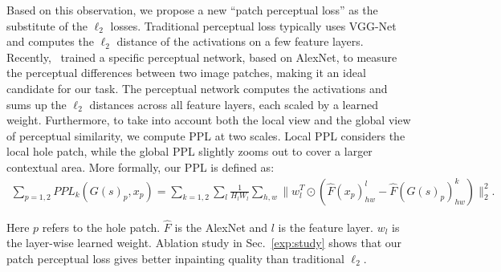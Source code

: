 Based on this observation, we propose a new ``patch perceptual loss'' as the substitute of the $\ell_2$ losses. Traditional perceptual loss typically uses VGG-Net and computes the $\ell_2$ distance of the activations on a few feature layers. Recently,~\cite{zhang2018unreasonable} trained a specific perceptual network, based on AlexNet, to measure the perceptual differences between two image patches, making it an ideal candidate for our task. The perceptual network computes the activations and sums up the $\ell_2$ distances across all feature layers, each scaled by a learned weight. Furthermore, to take into account both the local view and the global view of perceptual similarity, we compute PPL at two scales. Local PPL considers the local hole patch, while the global PPL slightly zooms out to cover a larger contextual area. More formally, our PPL is defined as:
\begin{eqnarray}
\sum\limits_{p=1,2}PPL_k(G(s)_p, x_p) = \sum\limits_{k=1,2}\sum\limits_l\frac{1}{H_lW_l}\sum\limits_{h,w}\parallel w_l^T\odot(\hat{F}(x_p)^l_{hw}-\hat{F}(G(s)_p)^k_{hw})\parallel^2_2.
\end{eqnarray}

Here $p$ refers to the hole patch. $\hat{F}$ is the AlexNet and $l$ is the feature layer. $w_l$ is the layer-wise learned weight. Ablation study in Sec.~\ref{exp:study} shows that our patch perceptual loss gives better inpainting quality than traditional $\ell_2$. 

